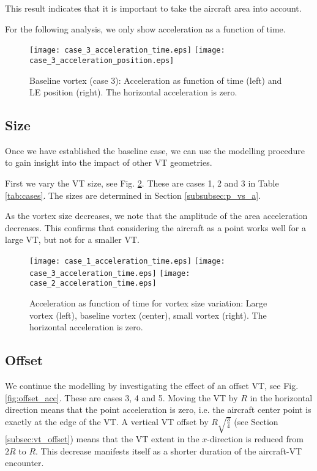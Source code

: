 \documentclass[smallextended]{svjour3}       %
\begin{document}
This result indicates that it is important to take the aircraft area into account.

For the following analysis, we only show acceleration as a function of time.

\begin{figure}
\texttt{[image: case\_3\_acceleration\_time.eps]}
\hspace{0.5cm}
\texttt{[image: case\_3\_acceleration\_position.eps]}
\caption{Baseline vortex (case 3): Acceleration as function of time (left) and LE position (right). The horizontal acceleration is zero.}
\label{fig:case_3_acc}
\end{figure}

\subsection{Size}

Once we have established the baseline case, we can use the modelling procedure to gain insight into the impact of other VT geometries.

First we vary the VT size, see Fig. \ref{fig:size_acc}. These are cases 1, 2 and 3 in Table \ref{tab:cases}. The sizes are determined in Section \ref{subsubsec:p_vs_a}.

As the vortex size decreases, we note that the amplitude of the area acceleration decreases. This confirms that considering the aircraft as a point works well for a large VT, but not for a smaller VT.

\begin{figure}
\texttt{[image: case\_1\_acceleration\_time.eps]}
\hspace{0.5cm}
\texttt{[image: case\_3\_acceleration\_time.eps]}
\hspace{0.5cm}
\texttt{[image: case\_2\_acceleration\_time.eps]}
\caption{Acceleration as function of time for vortex size variation: Large vortex (left), baseline vortex (center), small vortex (right). The horizontal acceleration is zero.}
\label{fig:size_acc}
\end{figure}

\subsection{Offset}

We continue the modelling by investigating the effect of an offset VT, see Fig. \ref{fig:offset_acc}. These are cases 3, 4 and 5. Moving the VT by $R$ in the horizontal direction means that the point acceleration is zero, i.e. the aircraft center point is exactly at the edge of the VT. A vertical VT offset by $R\sqrt{\frac{3}{4}}$ (see Section \ref{subsec:vt_offset}) means that the VT extent in the $x$-direction is reduced from $2R$ to $R$. This decrease manifests itself as a shorter duration of the aircraft-VT encounter.
\end{document}
